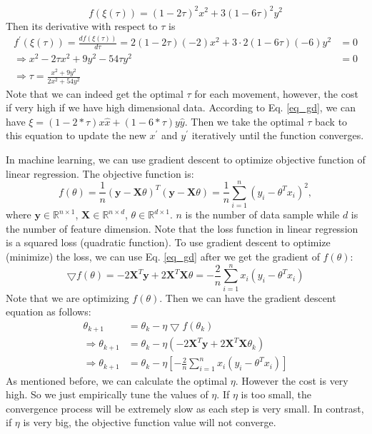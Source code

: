 \documentclass{llncs}
\begin{document}
\begin{equation}
    f(\xi(\tau))= (1-2\tau)^2 x^2 + 3(1-6\tau)^2y^2
\end{equation}
Then its derivative with respect to $\tau$ is
\begin{equation}
    \begin{aligned}
    f^\prime(\xi(\tau)) = \frac{d f(\xi(\tau))}{d \tau} = 2(1-2\tau)(-2)x^2+ 3\cdot 2(1-6\tau)(-6)y^2 &= 0 \\
    \Rightarrow  x^2-2\tau x^2 +9y^2 - 54\tau y^2 &= 0 \\
    \Rightarrow \tau = \frac{x^2+9y^2}{2x^2+54y^2}
    \end{aligned}
\end{equation}
Note that we can indeed get the optimal $\tau$ for each movement, however, the cost if very high if we have high dimensional data. 
According to Eq. \eqref{eq_gd}, we can have $\xi = (1-2*\tau)x \hat{x} + (1-6*\tau)y \hat{y}$. Then we take the optimal $\tau$ back to this equation to update the new $x^\prime$ and $y^\prime$ iteratively until the function converges.  

In machine learning, we can use gradient descent to optimize objective function of linear regression. The objective function is:
\begin{equation}
f(\theta)=\frac{1}{n}(\bm{y}-\bm{X}\theta)^T(\bm{y}-\bm{X}\theta) = \frac{1}{n}\sum\limits_{i=1}^n (y_i-\theta^T x_i)^2,
\end{equation}
where $\bm{y}\in \mathbb{R}^{n \times 1}$, $\bm{X} \in \mathbb{R}^{n\times d}$, $\theta \in \mathbb{R}^{d\times 1}$. $n$ is the number of data sample while $d$ is the number of feature dimension. Note that the loss function in linear regression is a squared loss (quadratic function). To use gradient descent to optimize (minimize) the loss, we can use Eq. \eqref{eq_gd} after we get the gradient of $f(\theta)$:
\begin{equation}
    \bigtriangledown f(\theta) = -2\bm{X}^T\bm{y} +2\bm{X}^T\bm{X}\theta = -\frac{2}{n}\sum\limits_{i=1}^n x_i(y_i-\theta^Tx_i)
\end{equation}
Note that we are optimizing $f(\theta)$. Then we can have the gradient descent equation as follows:
\begin{equation}
    \begin{aligned}
    \theta_{k+1} &= \theta_k - \eta \bigtriangledown f(\theta_k) \\
    \Rightarrow \theta_{k+1} &= \theta_k - \eta (-2\bm{X}^T\bm{y} +2\bm{X}^T\bm{X}\theta_k) \\
    \Rightarrow \theta_{k+1} &= \theta_k - \eta [-\frac{2}{n}\sum\limits_{i=1}^n x_i(y_i-\theta^Tx_i)]
    \end{aligned}
\end{equation}
As mentioned before, we can calculate the optimal $\eta$. However the cost is very high. So we just empirically tune the values of $\eta$. If $\eta$ is too small, the convergence process will be extremely slow as each step is very small. In contrast, if $\eta$ is very big, the objective function value will not converge.
\end{document}
